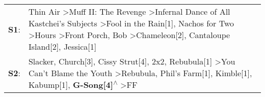 \begin{supertabular}{p{0.03\textwidth}p{0.92\textwidth}}
 \textbf{S1}:  &  Thin Air\textsuperscript{} \textgreater \enspace Muff II: The Revenge\textsuperscript{} \textgreater \enspace Infernal Dance of All Kastchei's Subjects\textsuperscript{} \textgreater \enspace Fool in the Rain[1]\textsuperscript{}, \enspace Nachos for Two\textsuperscript{} \textgreater \enspace Hours\textsuperscript{} \textgreater \enspace Front Porch\textsuperscript{}, \enspace Bob\textsuperscript{} \textgreater \enspace Chameleon[2]\textsuperscript{}, \enspace Cantaloupe Island[2]\textsuperscript{}, \enspace Jessica[1]\textsuperscript{}  \enspace  \\
 \textbf{S2}:  &                                   Slacker\textsuperscript{}, \enspace Church[3]\textsuperscript{}, \enspace Cissy Strut[4]\textsuperscript{}, \enspace 2x2\textsuperscript{}, \enspace Rebubula[1]\textsuperscript{} \textgreater \enspace You Can't Blame the Youth\textsuperscript{} \textgreater \enspace Rebubula\textsuperscript{}, \enspace Phil's Farm[1]\textsuperscript{}, \enspace Kimble[1]\textsuperscript{}, \enspace Kabump[1]\textsuperscript{}, \enspace \textbf{G-Song[4]\textsuperscript{$\wedge$}} \textgreater \enspace FF\textsuperscript{}  \enspace  \\
\end{supertabular}
